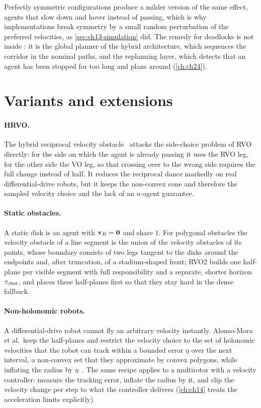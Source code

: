 Perfectly symmetric configurations produce a milder version of the same
effect, agents that slow down and hover instead of passing, which is why
implementations break symmetry by a small random perturbation of the
preferred velocities, as \cref{sec:ch13-simulation} did. The remedy for
deadlocks is not inside \orca: it is the global planner of the hybrid
architecture, which sequences the corridor in the nominal paths, and the
replanning layer, which detects that an agent has been stopped for too long
and plans around (\cref{ch:ch24}).

\section{Variants and extensions}
\label{sec:ch13-variants}

\paragraph{HRVO.}
The hybrid reciprocal velocity obstacle~\cite{snape2011hrvo} attacks the
side-choice problem of RVO directly: for the side on which the agent is
already passing it uses the RVO leg, for the other side the VO leg, so that
crossing over to the wrong side requires the full change instead of half.
It reduces the reciprocal dance markedly on real differential-drive robots,
but it keeps the non-convex cone and therefore the sampled velocity choice
and the lack of an $n$-agent guarantee.

\paragraph{Static obstacles.}
A static disk is an agent with $\mathbf{v}_B = \mathbf{0}$ and share $1$. For
polygonal obstacles the velocity obstacle of a line segment is the union of
the velocity obstacles of its points, whose boundary consists of two legs
tangent to the disks around the endpoints and, after truncation, of a
stadium-shaped front; RVO2 builds one half-plane per visible segment with
full responsibility and a separate, shorter horizon $\tau_{\mathrm{obst}}$,
and places these half-planes first so that they stay hard in the dense
fallback.

\paragraph{Non-holonomic robots.}
A differential-drive robot cannot fly an arbitrary velocity instantly.
Alonso-Mora et al.\ keep the \orca half-planes and restrict the velocity
choice to the set of holonomic velocities that the robot can track within a
bounded error $\eta$ over the next interval, a non-convex set that they
approximate by convex polygons, while inflating the radius by
$\eta$~\cite{alonsomora2013optimal}. The same recipe applies to a
multirotor with a velocity controller: measure the tracking error, inflate
the radius by it, and clip the velocity change per step to what the
controller delivers (\cref{ch:ch14} treats the acceleration limits
explicitly).

